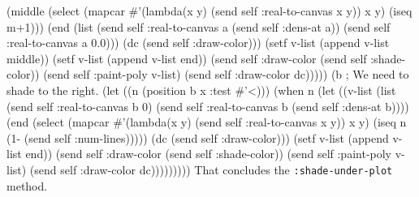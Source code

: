                     (middle 
                     (select (mapcar #'(lambda(x y)
                               (send self :real-to-canvas x y)) x y)
                       (iseq m+1)))
                     (end (list
                           (send self :real-to-canvas a 
                                 (send self :dens-at a))
                           (send self :real-to-canvas a 0.0)))
                    (dc (send self :draw-color)))
                (setf v-list (append v-list middle))
                (setf v-list (append v-list end))
                (send self :draw-color (send self :shade-color))
                (send self :paint-poly v-list)
                (send self :draw-color dc)))))
         (b ; We need to shade to the right.
          (let ((n (position b x :test #'<)))
            (when n
              (let ((v-list 
                     (list
                       (send self :real-to-canvas b 0)
                       (send self :real-to-canvas b (send self
                       :dens-at b))))
                    (end
                     (select (mapcar #'(lambda(x y)
                                (send self :real-to-canvas x y)) x y)
                             (iseq n (1- (send self :num-lines)))))
                    (dc (send self :draw-color)))
                (setf v-list (append v-list end))
                (send self :draw-color (send self :shade-color))
                (send self :paint-poly v-list)
                (send self :draw-color dc)))))))))
\eatline
{}\nwendcode{}\nwdocspar
That concludes the {\tt{}:shade-under-plot} method.

